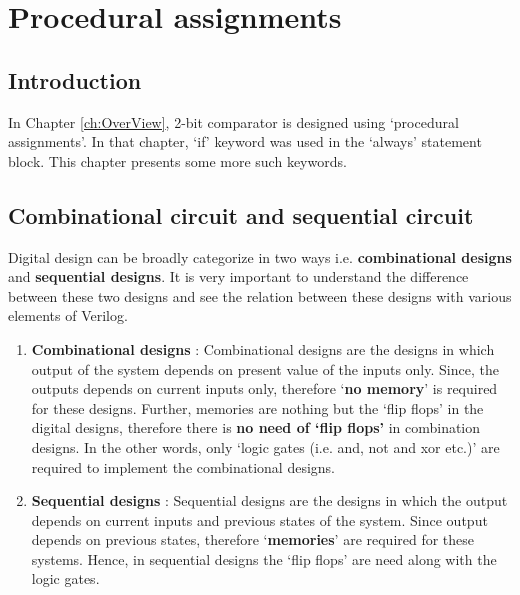 \chapter{Procedural assignments} \label{ch:behavioralModeling}

\graphicspath{{Chapters/ProceduralAssignments/Figures/}}

\section{Introduction}
In Chapter \ref{ch:OverView}, 2-bit comparator is designed using `procedural assignments'. In that chapter, `if' keyword was used in the `always' statement block. This chapter presents some more such keywords. 

\section{Combinational circuit and sequential circuit}\label{sec:combSeqCircuit}

Digital design can be broadly categorize in two ways i.e. \textbf{combinational designs} and \textbf{sequential designs}. It is very important to understand the difference between these two designs and see the relation between these designs with various elements of Verilog. 
\begin{enumerate}
	\item \textbf{Combinational designs} : Combinational designs are the designs in which output of the system depends on present value of the inputs only. Since, the outputs depends on current inputs only, therefore `\textbf{no memory}' is required for these designs. Further, memories are nothing but the `flip flops' in the digital designs, therefore there is \textbf{no need of `flip flops'} in combination designs. In the other words, only `logic gates (i.e. and, not and xor etc.)' are required to implement the combinational designs.
	
	\item \textbf{Sequential designs} : Sequential designs are the designs in which the output depends on current inputs and previous states of the system. Since output depends on previous states, therefore `\textbf{memories}' are required for these systems. Hence, in sequential designs the `flip flops' are need along with the logic gates. 
\end{enumerate}

